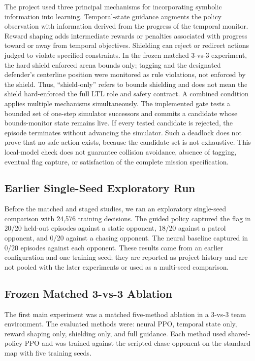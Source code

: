 \documentclass[letterpaper]{article}
\begin{document}
The project used three principal mechanisms for incorporating symbolic information into learning. Temporal-state guidance augments the policy observation with information derived from the progress of the temporal monitor. Reward shaping adds intermediate rewards or penalties associated with progress toward or away from temporal objectives. Shielding can reject or redirect actions judged to violate specified constraints. In the frozen matched 3-vs-3 experiment, the hard shield enforced arena bounds only; tagging and the designated defender's centerline position were monitored as rule violations, not enforced by the shield. Thus, ``shield-only'' refers to bounds shielding and does not mean the shield hard-enforced the full LTL role and safety contract. A combined condition applies multiple mechanisms simultaneously. The implemented gate tests a bounded set of one-step simulator successors and commits a candidate whose bounds-monitor state remains live. If every tested candidate is rejected, the episode terminates without advancing the simulator. Such a deadlock does not prove that no safe action exists, because the candidate set is not exhaustive. This local-model check does not guarantee collision avoidance, absence of tagging, eventual flag capture, or satisfaction of the complete mission specification.
    
\subsection{Earlier Single-Seed Exploratory Run}

Before the matched and staged studies, we ran an exploratory single-seed comparison with 24,576 training decisions. The guided policy captured the flag in 20/20 held-out episodes against a static opponent, 18/20 against a patrol opponent, and 0/20 against a chasing opponent. The neural baseline captured in 0/20 episodes against each opponent. These results came from an earlier configuration and one training seed; they are reported as project history and are not pooled with the later experiments or used as a multi-seed comparison.

\subsection{Frozen Matched 3-vs-3 Ablation}

The first main experiment was a matched five-method ablation in a 3-vs-3 team environment. The evaluated methods were: neural PPO, temporal state only, reward shaping only, shielding only, and full guidance. Each method used shared-policy PPO and was trained against the scripted chase opponent on the standard map with five training seeds.
\end{document}
